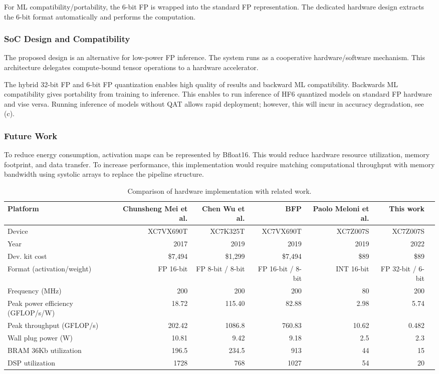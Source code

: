 For ML compatibility/portability, the 6-bit FP is wrapped into the standard FP representation. The dedicated hardware design extracts the 6-bit format automatically and performs the computation.

\subsubsection{SoC Design and Compatibility}
The proposed design is an alternative for low-power FP inference. The system runs as a cooperative hardware/software mechanism. This architecture delegates compute-bound tensor operations to a hardware accelerator.

The hybrid 32-bit FP and 6-bit FP quantization enables high quality of results and backward ML compatibility. Backwards ML compatibility gives portability from training to inference. This enables to run inference of HF6 quantized models on standard FP hardware and vise versa. Running inference of models without QAT allows rapid deployment; however, this will incur in accuracy degradation, see (c).

\subsubsection{Future Work}
To reduce energy consumption, activation maps can be represented by Bfloat16. This would reduce hardware resource utilization, memory footprint, and data transfer. To increase performance, this implementation would require matching computational throughput with memory bandwidth using systolic arrays to replace the pipeline structure.
\begin{table}[!t]\centering
	\caption{Comparison of hardware implementation with related work.}\label{tab:comparison}
	\scriptsize
	\begin{tabular}{lrrrrrr}\toprule
		Platform &Chunsheng Mei et al. \cite{mei2017200mhz} &Chen Wu et al. \cite{wu2021low} &BFP \cite{lian2019high} &Paolo Meloni et al. \cite{meloni2019cnn} &This work \\\midrule
		Device &XC7VX690T &XC7K325T &XC7VX690T &XC7Z007S &XC7Z007S \\
		Year &2017 &2019 &2019 &2019 &2022 \\
		Dev. kit cost &\$7,494 &\$1,299 &\$7,494 &\$89 &\$89 \\
		Format (activation/weight) &FP 16-bit &FP 8-bit / 8-bit &FP 16-bit / 8-bit &INT 16-bit &FP 32-bit / 6-bit \\
		Frequency (MHz) &200 &200 &200 &80 &200 \\
		Peak power efficiency (GFLOP/s/W) &18.72 &115.40 &82.88 &2.98 &5.74 \\
		Peak throughput (GFLOP/s) & 202.42 & 1086.8 & 760.83 &  10.62& 0.482\\
		Wall plug power (W) &10.81 &9.42 &9.18 &2.5 &2.3 \\
		BRAM 36Kb utilization &196.5 &234.5 &913 &44 &15 \\
		DSP utilization &1728 &768 &1027 &54 &20 \\
		\bottomrule
	\end{tabular}
\end{table}